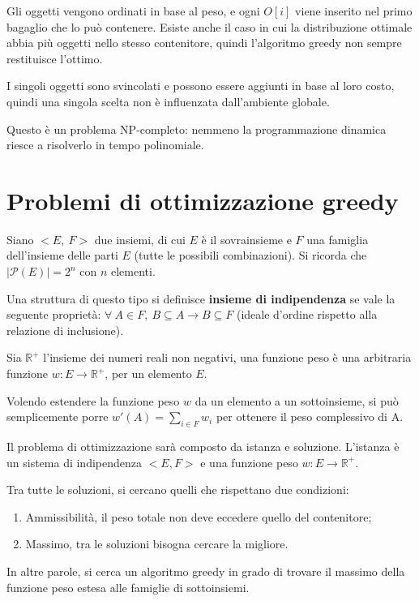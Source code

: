 Gli oggetti vengono ordinati in base al peso, e ogni $O[i]$ viene inserito nel primo bagaglio che lo può contenere. Esiste anche il caso in cui la distribuzione ottimale abbia più oggetti nello stesso contenitore, quindi l'algoritmo greedy non sempre restituisce l'ottimo.

I singoli oggetti sono svincolati e possono essere aggiunti in base al loro costo, quindi una singola scelta non è influenzata dall'ambiente globale. 

Questo è un problema NP-completo: nemmeno la programmazione dinamica riesce a risolverlo in tempo polinomiale.

\section{Problemi di ottimizzazione greedy}
Siano $<E,\ F>$ due insiemi, di cui $E$ è il sovrainsieme e $F$ una famiglia dell'insieme delle parti $E$ (tutte le possibili combinazioni). Si ricorda che $|\mathcal{P}(E)| = 2^n$ con $n$ elementi.

Una struttura di questo tipo si definisce \textbf{insieme di indipendenza} se vale la seguente proprietà: $\forall\ A \in F,\ B \subseteq A \rightarrow B \subseteq F$ (ideale d'ordine rispetto alla relazione di inclusione). 

Sia $\mathbb{R}^+$ l'insieme dei numeri reali non negativi, una funzione peso è una arbitraria funzione $w : E \rightarrow \mathbb{R}^+$, per un elemento $E$.

Volendo estendere la funzione peso $w$ da un elemento a un sottoinsieme, si può semplicemente porre $w'(A) = \sum_{i \in F}w_i$ per ottenere il peso complessivo di A.

Il problema di ottimizzazione sarà composto da istanza e soluzione. L'istanza è un sistema di indipendenza $<E, F>$ e una funzione peso $w : E \rightarrow \mathbb{R}^+$.

Tra tutte le soluzioni, si cercano quelli che rispettano due condizioni:
\begin{enumerate}
	\item Ammissibilità, il peso totale non deve eccedere quello del contenitore;
	\item Massimo, tra le soluzioni bisogna cercare la migliore.
\end{enumerate}

In altre parole, si cerca un algoritmo greedy in grado di trovare il massimo della funzione peso estesa alle famiglie di sottoinsiemi. 

